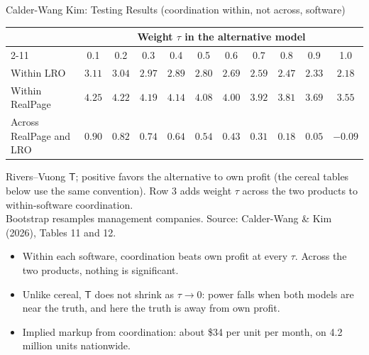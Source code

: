 \documentclass[aspectratio=169,10pt]{beamer}
\begin{document}
\begin{frame}{Calder-Wang Kim: Testing Results (coordination within, not across, software)}
\centering
\small
\begin{tabular}{l cccccccccc}
\toprule
 & \multicolumn{10}{c}{Weight $\tau$ in the alternative model} \\
\cmidrule(lr){2-11}
 & 0.1 & 0.2 & 0.3 & 0.4 & 0.5 & 0.6 & 0.7 & 0.8 & 0.9 & 1.0 \\
\midrule
Within LRO & $3.11$ & $3.04$ & $2.97$ & $2.89$ & $2.80$ & $2.69$ & $2.59$ & $2.47$ & $2.33$ & \alert{$2.18$} \\
Within RealPage & $4.25$ & $4.22$ & $4.19$ & $4.14$ & $4.08$ & $4.00$ & $3.92$ & $3.81$ & $3.69$ & \alert{$3.55$} \\
\midrule
Across RealPage and LRO & $0.90$ & $0.82$ & $0.74$ & $0.64$ & $0.54$ & $0.43$ & $0.31$ & $0.18$ & $0.05$ & $-0.09$ \\
\bottomrule
\end{tabular}

{\footnotesize Rivers--Vuong $\mathsf{T}$; positive favors the alternative to own profit (the cereal tables below use the same convention). Row 3 adds weight $\tau$ across the two products to within-software coordination.\\
{\color{lightgray}Bootstrap resamples management companies. Source: Calder-Wang \& Kim (2026), Tables 11 and 12.}}

\raggedright
\begin{itemize}
\item Within each software, coordination beats own profit at every $\tau$. Across the two products, nothing is significant.
\item Unlike cereal, $\mathsf{T}$ does not shrink as $\tau \to 0$: power falls when both models are near the truth, and here the truth is away from own profit.
\item Implied markup from coordination: about \$34 per unit per month, on 4.2 million units nationwide.
\end{itemize}
\end{frame}
\end{document}
